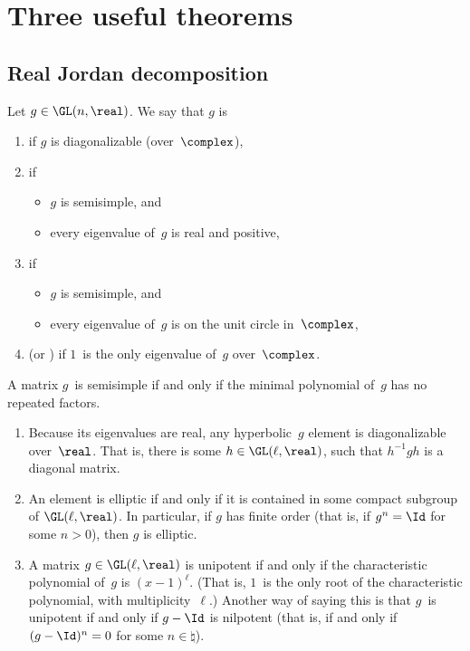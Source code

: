 \section{Three useful theorems}

\subsection{Real Jordan decomposition}

\begin{defn} \label{hypelluniDefn}
 Let $g \in\GL(n,\real)$. We say that $g$ is
 \begin{enumerate}
 \item {} if $g$ is
diagonalizable (over~$\complex$),
 \item  {} if
 \begin{itemize}
 \item $g$ is semisimple, and
 \item every eigenvalue of~$g$ is real and positive,
 \end{itemize}
 \item {} if 
 \begin{itemize}
 \item $g$ is semisimple, and
 \item every eigenvalue of~$g$ is on the unit circle
in~$\complex$,
 \end{itemize}
 \item {} (or
) if $1$~is the
only eigenvalue of~$g$ over~$\complex$.
 \end{enumerate}
 \end{defn}

\begin{rem} \label{SSeltRem}
 A matrix $g$~is semisimple if and only
if the minimal polynomial of~$g$ has no repeated factors.
 \begin{enumerate}
 \item Because its eigenvalues are real, any hyperbolic~$g$
element is diagonalizable over~$\real$. That is, there is
some $h \in \GL(\ell,\real)$, such that $h^{-1} g h$ is a
diagonal matrix.
 \item \label{SSeltRem-cpct}
 An element is elliptic if and only if it is
contained in some compact subgroup of $\GL(\ell,\real)$. In
particular, if $g$ has finite order (that is, if $g^n = \Id$
for some $n > 0$), then $g$ is elliptic.
 \item A matrix $g \in \GL(\ell,\real)$ is unipotent if and
only if the characteristic polynomial of~$g$ is $(x-1)^\ell$.
(That is, $1$~is the only root of the characteristic
polynomial, with multiplicity~$\ell$.) Another way of saying
this is that $g$~is unipotent if and only if $g - \Id$ is
nilpotent (that is, if and only if $(g - \Id)^n = 0$ for some
$n \in \natural$).
 \end{enumerate}
 \end{rem}
 

